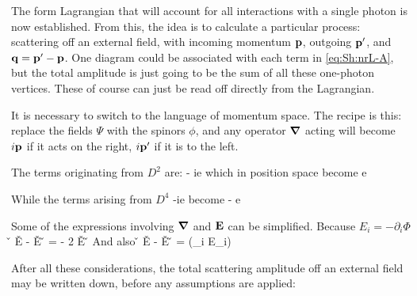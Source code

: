 The form Lagrangian that will account for all interactions with a single photon is now established.  From this, the idea is to calculate a particular process: scattering off an external field, with incoming momentum $\mathbf{p}$, outgoing $\mathbf{p'}$, and $\mathbf{q} = \mathbf{p'} - \mathbf{p}$. 
One diagram could be associated with each term in \eqref{eq:Sh:nrL-A}, but the total amplitude is just going to be the sum of all these one-photon vertices.  These of course can just be read off directly from the Lagrangian.

It is necessary to switch to the language of momentum space.  The recipe is this: replace the fields $\Psi$ with the spinors $\phi$, and any operator $\grad$ acting will become $i\mathbf{p}$ if it acts on the right, $i\mathbf{p'}$ if it is to the left.

The terms originating from $D^2$ are:
\beq
	- ie   
\eeq
which in position space become
\beq
	e  
\eeq

While the terms arising from $D^4$
\beq
-ie  
\eeq
become
\beq
- e  
\eeq


Some of the expressions involving $\grad$ and $\mathbf{E}$ can be simplified.  Because $E_i = -\partial_i \Phi$
\beq
	\v{\grad} \times \v{E} - \v{E} \times \v{\grad} =  - 2 \v{E} \times \v{\grad}
\eeq
And also
\beq
\v{\grad} \smalldot \v{E} - \v{E} \smalldot \v{\grad} = (\partial_i E_i)
\eeq


After all these considerations, the total scattering amplitude off an external field may be written down, before any assumptions are applied:



